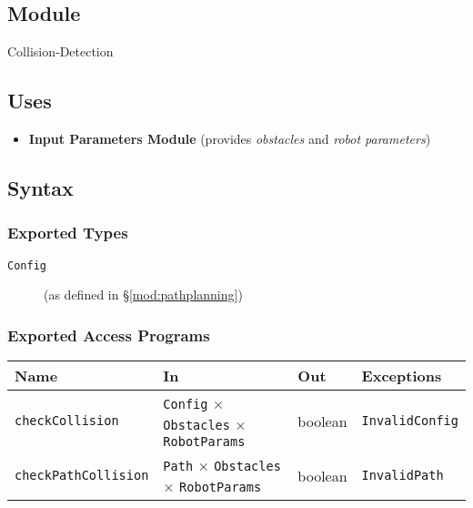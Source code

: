 \documentclass[12pt, titlepage]{article}
\begin{document}
\subsection{Module}
Collision‑Detection

\subsection{Uses}
\begin{itemize}
  \item \textbf{Input Parameters Module} (provides \textit{obstacles} and \textit{robot parameters})
\end{itemize}

\subsection{Syntax}
\subsubsection{Exported Types}
\begin{description}
  \item[\texttt{Config}] (as defined in \S\ref{mod:pathplanning})
\end{description}

\subsubsection{Exported Access Programs}
\begin{center}
\renewcommand{\arraystretch}{1.35}
\begin{tabular}{p{4.1cm} p{5.3cm} p{3.4cm} p{3.1cm}}
\toprule
\textbf{Name} & \textbf{In} & \textbf{Out} & \textbf{Exceptions}\\ \midrule
\texttt{checkCollision} & \texttt{Config} $\times$ \texttt{Obstacles} $\times$ \texttt{RobotParams} & boolean & \texttt{InvalidConfig}\\
\texttt{checkPathCollision} & \texttt{Path} $\times$ \texttt{Obstacles} $\times$ \texttt{RobotParams} & boolean & \texttt{InvalidPath}\\

\bottomrule
\end{tabular}
\end{center}
\end{document}
